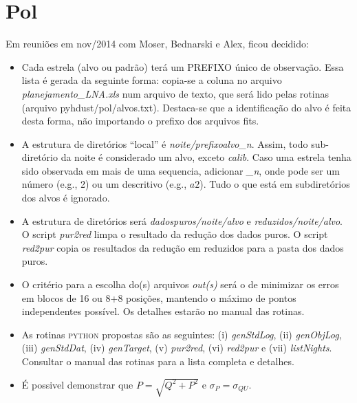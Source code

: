 

\chapter{Pol}
Em reuniões em nov/2014 com Moser, Bednarski e Alex, ficou decidido:
\begin{itemize}
    \item Cada estrela (alvo ou padrão) terá um PREFIXO único de observação.
Essa lista é gerada da seguinte forma: copia-se a coluna no arquivo \textit{
planejamento\_LNA.xls} num arquivo de texto, que será lido pelas rotinas
(arquivo pyhdust/pol/alvos.txt). Destaca-se que a identificação do alvo é feita
desta forma, não importando o prefixo dos arquivos fits. 
    \item A estrutura de diretórios ``local'' é \textit{noite/prefixoalvo\_n}.
Assim, todo sub-diretório da noite é considerado um alvo, exceto \textit{calib}. 
Caso uma estrela tenha sido observada em mais de uma sequencia, adicionar
\textit{\_n}, onde pode ser um número (e.g., 2) ou um descritivo (e.g., $a2$).
Tudo o que está em subdiretórios dos alvos é ignorado.
    \item A estrutura de diretórios será \textit{dadospuros/noite/alvo} e
\textit{reduzidos/noite/alvo}. O script \textit{pur2red} limpa o resultado da
redução dos dados puros. O script \textit{red2pur} copia os resultados da
redução em reduzidos para a pasta dos dados puros.
    \item O critério para a escolha do(s) arquivos \textit{out(s)} será o de
minimizar os erros em blocos de 16 ou 8+8 posições, mantendo o máximo de pontos
independentes possível. Os detalhes estarão no manual das rotinas.
    \item As rotinas \textsc{python} propostas são as seguintes: (i)
\textit{genStdLog}, (ii) \textit{genObjLog}, (iii) \textit{genStdDat}, 
(iv) \textit{genTarget}, (v) \textit{pur2red}, (vi) \textit{red2pur} e (vii)
\textit{listNights}. Consultar o manual das rotinas para a lista completa e
detalhes.
    \item É possivel demonstrar que $P=\sqrt{Q^2+P^2}$ e $\sigma_P=\sigma_{QU}$.
\end{itemize}

